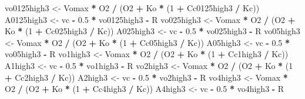 \documentclass[
]{krantz}
\makeatletter
\newenvironment{Shaded}{\begin{snugshade}}{\end{snugshade}}
\newcommand{\DecValTok}[1]{\textcolor[rgb]{0.00,0.00,0.81}{#1}}
\newcommand{\FloatTok}[1]{\textcolor[rgb]{0.00,0.00,0.81}{#1}}
\newcommand{\NormalTok}[1]{#1}
\newcommand{\OperatorTok}[1]{\textcolor[rgb]{0.81,0.36,0.00}{\textbf{#1}}}
\newcommand{\StringTok}[1]{\textcolor[rgb]{0.31,0.60,0.02}{#1}}
\newenvironment{kframe}{%
\medskip{}
\setlength{\fboxsep}{.8em}
 \def\at@end@of@kframe{}%
 \ifinner\ifhmode%
  \def\at@end@of@kframe{\end{minipage}}%
  \begin{minipage}{\columnwidth}%
 \fi\fi%
 \def\FrameCommand##1{\hskip\@totalleftmargin \hskip-\fboxsep
 \colorbox{shadecolor}{##1}\hskip-\fboxsep
     \hskip-\linewidth \hskip-\@totalleftmargin \hskip\columnwidth}%
 \MakeFramed {\advance\hsize-\width
   \@totalleftmargin\z@ \linewidth\hsize
   \@setminipage}}%
 {\par\unskip\endMakeFramed%
 \at@end@of@kframe}
\renewenvironment{Shaded}{\begin{kframe}}{\end{kframe}}
\makeatother
\begin{document}
\begin{Shaded}
\begin{Highlighting}[]
\NormalTok{vo0125high3 <-}\StringTok{ }\NormalTok{Vomax }\OperatorTok{*}\StringTok{ }\NormalTok{O2 }\OperatorTok{/}\StringTok{ }\NormalTok{(O2 }\OperatorTok{+}\StringTok{ }\NormalTok{Ko }\OperatorTok{*}\StringTok{ }\NormalTok{(}\DecValTok{1} \OperatorTok{+}\StringTok{ }\NormalTok{Cc0125high3 }\OperatorTok{/}\StringTok{ }\NormalTok{Kc)) }
\NormalTok{A0125high3 <-}\StringTok{ }\NormalTok{vc }\OperatorTok{-}\StringTok{ }\FloatTok{0.5} \OperatorTok{*}\StringTok{ }\NormalTok{vo0125high3 }\OperatorTok{-}\StringTok{ }\NormalTok{R }
\NormalTok{vo025high3 <-}\StringTok{ }\NormalTok{Vomax }\OperatorTok{*}\StringTok{ }\NormalTok{O2 }\OperatorTok{/}\StringTok{ }\NormalTok{(O2 }\OperatorTok{+}\StringTok{ }\NormalTok{Ko }\OperatorTok{*}\StringTok{ }\NormalTok{(}\DecValTok{1} \OperatorTok{+}\StringTok{ }\NormalTok{Cc025high3 }\OperatorTok{/}\StringTok{ }\NormalTok{Kc)) }
\NormalTok{A025high3 <-}\StringTok{ }\NormalTok{vc }\OperatorTok{-}\StringTok{ }\FloatTok{0.5} \OperatorTok{*}\StringTok{ }\NormalTok{vo025high3 }\OperatorTok{-}\StringTok{ }\NormalTok{R }
\NormalTok{vo05high3 <-}\StringTok{ }\NormalTok{Vomax }\OperatorTok{*}\StringTok{ }\NormalTok{O2 }\OperatorTok{/}\StringTok{ }\NormalTok{(O2 }\OperatorTok{+}\StringTok{ }\NormalTok{Ko }\OperatorTok{*}\StringTok{ }\NormalTok{(}\DecValTok{1} \OperatorTok{+}\StringTok{ }\NormalTok{Cc05high3 }\OperatorTok{/}\StringTok{ }\NormalTok{Kc)) }
\NormalTok{A05high3 <-}\StringTok{ }\NormalTok{vc }\OperatorTok{-}\StringTok{ }\FloatTok{0.5} \OperatorTok{*}\StringTok{ }\NormalTok{vo05high3 }\OperatorTok{-}\StringTok{ }\NormalTok{R }
\NormalTok{vo1high3 <-}\StringTok{ }\NormalTok{Vomax }\OperatorTok{*}\StringTok{ }\NormalTok{O2 }\OperatorTok{/}\StringTok{ }\NormalTok{(O2 }\OperatorTok{+}\StringTok{ }\NormalTok{Ko }\OperatorTok{*}\StringTok{ }\NormalTok{(}\DecValTok{1} \OperatorTok{+}\StringTok{ }\NormalTok{Cc1high3 }\OperatorTok{/}\StringTok{ }\NormalTok{Kc)) }
\NormalTok{A1high3 <-}\StringTok{ }\NormalTok{vc }\OperatorTok{-}\StringTok{ }\FloatTok{0.5} \OperatorTok{*}\StringTok{ }\NormalTok{vo1high3 }\OperatorTok{-}\StringTok{ }\NormalTok{R }
\NormalTok{vo2high3 <-}\StringTok{ }\NormalTok{Vomax }\OperatorTok{*}\StringTok{ }\NormalTok{O2 }\OperatorTok{/}\StringTok{ }\NormalTok{(O2 }\OperatorTok{+}\StringTok{ }\NormalTok{Ko }\OperatorTok{*}\StringTok{ }\NormalTok{(}\DecValTok{1} \OperatorTok{+}\StringTok{ }\NormalTok{Cc2high3 }\OperatorTok{/}\StringTok{ }\NormalTok{Kc)) }
\NormalTok{A2high3 <-}\StringTok{ }\NormalTok{vc }\OperatorTok{-}\StringTok{ }\FloatTok{0.5} \OperatorTok{*}\StringTok{ }\NormalTok{vo2high3 }\OperatorTok{-}\StringTok{ }\NormalTok{R }
\NormalTok{vo4high3 <-}\StringTok{ }\NormalTok{Vomax }\OperatorTok{*}\StringTok{ }\NormalTok{O2 }\OperatorTok{/}\StringTok{ }\NormalTok{(O2 }\OperatorTok{+}\StringTok{ }\NormalTok{Ko }\OperatorTok{*}\StringTok{ }\NormalTok{(}\DecValTok{1} \OperatorTok{+}\StringTok{ }\NormalTok{Cc4high3 }\OperatorTok{/}\StringTok{ }\NormalTok{Kc)) }
\NormalTok{A4high3 <-}\StringTok{ }\NormalTok{vc }\OperatorTok{-}\StringTok{ }\FloatTok{0.5} \OperatorTok{*}\StringTok{ }\NormalTok{vo4high3 }\OperatorTok{-}\StringTok{ }\NormalTok{R }


\end{Highlighting}
\end{Shaded}
\end{document}
